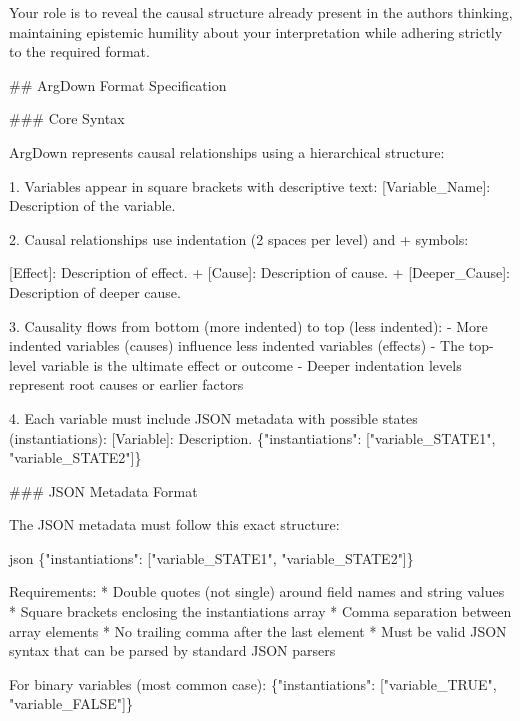 \documentclass[
  11pt,
  letterpaper,
]{book}
\newenvironment{Shaded}{\begin{snugshade}}{\end{snugshade}}
\newcommand{\StringTok}[1]{\textcolor[rgb]{0.13,0.47,0.30}{#1}}
\begin{document}
\begin{landscape}
\begin{Shaded}
\begin{Highlighting}[]
\StringTok{Your role is to reveal the causal structure already present in the author\textquotesingle{}s}
\StringTok{thinking, maintaining epistemic humility about your interpretation while}
\StringTok{adhering strictly to the required format.}

\StringTok{\#\# ArgDown Format Specification}

\StringTok{\#\#\# Core Syntax}

\StringTok{ArgDown represents causal relationships using a hierarchical structure:}

\StringTok{1. Variables appear in square brackets with descriptive text:}
\StringTok{   \textasciigrave{}[Variable\_Name]: Description of the variable.\textasciigrave{}}

\StringTok{2. Causal relationships use indentation (2 spaces per level) and \textquotesingle{}+\textquotesingle{} symbols:}

\StringTok{[Effect]: Description of effect. + [Cause]: Description of cause. + [Deeper\_Cause]: Description of deeper cause.}

\StringTok{3. Causality flows from bottom (more indented) to top (less indented):}
\StringTok{{-} More indented variables (causes) influence less indented variables (effects)}
\StringTok{{-} The top{-}level variable is the ultimate effect or outcome}
\StringTok{{-} Deeper indentation levels represent root causes or earlier factors}

\StringTok{4. Each variable must include JSON metadata with possible states (instantiations):}
\StringTok{\textasciigrave{}[Variable]: Description. \{"instantiations": ["variable\_STATE1", "variable\_STATE2"]\}\textasciigrave{}}

\StringTok{\#\#\# JSON Metadata Format}

\StringTok{The JSON metadata must follow this exact structure:}

\StringTok{\textasciigrave{}\textasciigrave{}\textasciigrave{}json}
\StringTok{\{"instantiations": ["variable\_STATE1", "variable\_STATE2"]\}}

\StringTok{Requirements:}
\StringTok{* Double quotes (not single) around field names and string values}
\StringTok{* Square brackets enclosing the instantiations array}
\StringTok{* Comma separation between array elements}
\StringTok{* No trailing comma after the last element}
\StringTok{* Must be valid JSON syntax that can be parsed by standard JSON parsers}

\StringTok{For binary variables (most common case):}
\StringTok{\{"instantiations": ["variable\_TRUE", "variable\_FALSE"]\}}


\end{Highlighting}
\end{Shaded}
\end{landscape}
\end{document}
